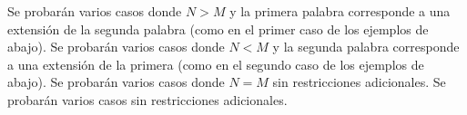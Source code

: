 \documentclass{oci}
\begin{document}
\begin{scoreDescription}
   Se probarán varios casos donde $N > M$ y la primera palabra 
  corresponde a una extensión de la segunda palabra (como en el primer caso de los ejemplos de abajo).
   Se probarán varios casos donde $N < M$ y la segunda palabra 
  corresponde a una extensión de la primera (como en el segundo caso de los ejemplos de abajo).
   Se probarán varios casos donde $N=M$ sin restricciones adicionales.
   Se probarán varios casos sin restricciones adicionales.
\end{scoreDescription}

\begin{sampleDescription}
\end{sampleDescription}
\end{document}
